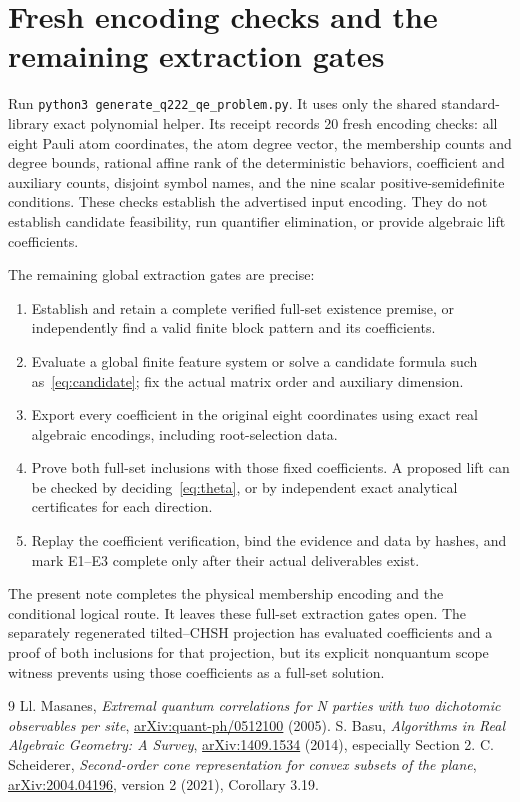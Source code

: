 \documentclass[11pt]{article}
\begin{document}
\section{Fresh encoding checks and the remaining extraction gates}
Run \texttt{python3 generate\_q222\_qe\_problem.py}. It uses only the shared standard-library exact polynomial helper. Its receipt records 20 fresh encoding checks: all eight Pauli atom coordinates, the atom degree vector, the membership counts and degree bounds, rational affine rank of the deterministic behaviors, coefficient and auxiliary counts, disjoint symbol names, and the nine scalar positive-semidefinite conditions. These checks establish the advertised input encoding. They do not establish candidate feasibility, run quantifier elimination, or provide algebraic lift coefficients.

The remaining global extraction gates are precise:
\begin{enumerate}
\item Establish and retain a complete verified full-set existence premise, or independently find a valid finite block pattern and its coefficients.
\item Evaluate a global finite feature system or solve a candidate formula such as~\eqref{eq:candidate}; fix the actual matrix order and auxiliary dimension.
\item Export every coefficient in the original eight coordinates using exact real algebraic encodings, including root-selection data.
\item Prove both full-set inclusions with those fixed coefficients. A proposed lift can be checked by deciding~\eqref{eq:theta}, or by independent exact analytical certificates for each direction.
\item Replay the coefficient verification, bind the evidence and data by hashes, and mark E1--E3 complete only after their actual deliverables exist.
\end{enumerate}
The present note completes the physical membership encoding and the conditional logical route. It leaves these full-set extraction gates open. The separately regenerated tilted--CHSH projection has evaluated coefficients and a proof of both inclusions for that projection, but its explicit nonquantum scope witness prevents using those coefficients as a full-set solution.

\begin{thebibliography}{9}
 Ll. Masanes,
\emph{Extremal quantum correlations for N parties with two dichotomic observables per site},
\href{https://arxiv.org/abs/quant-ph/0512100}{arXiv:quant-ph/0512100} (2005).
 S. Basu,
\emph{Algorithms in Real Algebraic Geometry: A Survey},
\href{https://arxiv.org/abs/1409.1534}{arXiv:1409.1534} (2014), especially Section 2.
 C. Scheiderer,
\emph{Second-order cone representation for convex subsets of the plane},
\href{https://arxiv.org/abs/2004.04196}{arXiv:2004.04196}, version 2 (2021), Corollary 3.19.
\end{thebibliography}
\end{document}
